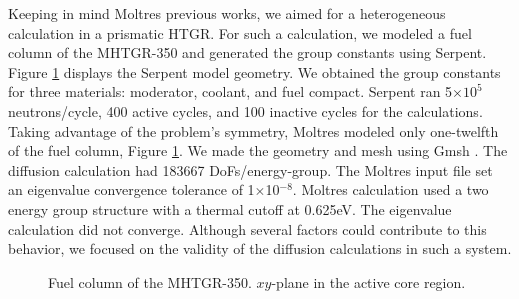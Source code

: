 \documentclass[11pt,letterpaper]{article}
\begin{document}
Keeping in mind Moltres previous works, we aimed for a heterogeneous calculation in a prismatic \gls{HTGR}.
For such a calculation, we modeled a fuel column of the MHTGR-350 and generated the group constants using Serpent.
Figure \ref{fig:fuelcolumn} displays the Serpent model geometry.
We obtained the group constants for three materials: moderator, coolant, and fuel compact.
Serpent ran 5$\times 10^5$ neutrons/cycle, 400 active cycles, and 100 inactive cycles for the calculations.
Taking advantage of the problem's symmetry, Moltres modeled only one-twelfth of the fuel column, Figure \ref{fig:fuelcolumn}.
We made the geometry and mesh using Gmsh \cite{geuzaine_gmsh_2020}.
The diffusion calculation had 183667 \glspl{DoF}/energy-group.
The Moltres input file set an eigenvalue convergence tolerance of 1$\times$10$^{-8}$.
Moltres calculation used a two energy group structure with a thermal cutoff at 0.625eV.
The eigenvalue calculation did not converge.
Although several factors could contribute to this behavior, we focused on the validity of the diffusion calculations in such a system.


\begin{figure}[htbp!]
	\centering
	\hfill
    \caption{Fuel column of the MHTGR-350. $xy$-plane in the active core region.}
	\label{fig:fuelcolumn}
\end{figure}
\end{document}
